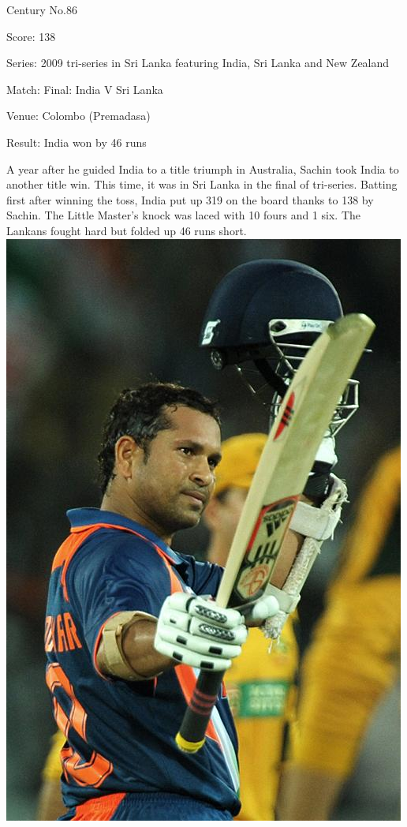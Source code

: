 \documentclass[11pt, a4paper]{article}
\begin{document}
Century No.86 

Score: 138 

Series: 2009 tri-series in Sri Lanka featuring India, Sri Lanka and New Zealand 

Match: Final: India V Sri Lanka 

Venue: Colombo (Premadasa) 

Result: India won by 46 runs 

A year after he guided India to a title triumph in Australia, Sachin took India to another title win. This time, it was in Sri Lanka in the final of tri-series. Batting first after winning the toss, India put up 319 on the board thanks to 138 by Sachin. The Little Master's knock was laced with 10 fours and 1 six. The Lankans fought hard but folded up 46 runs short.
\newpage
\includegraphics[height=0.75\textheight]{pics/87.jpg}
\end{document}
